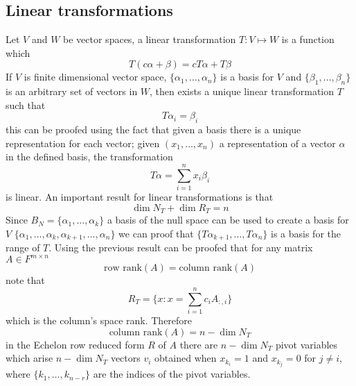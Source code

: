 \documentclass[../main.tex]{subfiles}
\begin{document}
\subsection{Linear transformations}
Let $V$ and $W$ be vector spaces, a linear transformation $T:V\mapsto W$ is a function which
\begin{equation*}
    T(c\alpha + \beta) = cT\alpha + T\beta
\end{equation*}
If $V$ is finite dimensional vector space, $\{\alpha_1,\dots,\alpha_n\}$ is a basis for $V$ and $\{\beta_1,\dots,\beta_n\}$ is an arbitrary set of vectors in $W$, then exists a unique linear transformation $T$ such that 
\begin{equation*}
    T\alpha_i = \beta_i
\end{equation*}
this can be proofed using the fact that given a basis there is a unique representation for each vector; given $(x_1,\dots,x_n)$ a representation of a vector $\alpha$ in the defined basis, the transformation
\begin{equation*}
    T\alpha = \sum_{i=1}^n x_i \beta_i
\end{equation*}
is linear.
An important result for linear transformations is that
\begin{equation*}
    \dim N_T + \dim R_T = n
\end{equation*}
Since $B_N = \{\alpha_1,\dots,\alpha_k\}$ a basis of the null space can be used to create a basis for $V$ $\{\alpha_1,\dots,\alpha_k,\alpha_{k+1},\dots,\alpha_n\}$ we can proof that $\{T\alpha_{k+1},\dots,T\alpha_n\}$ is a basis for the range of $T$.
Using the previous result can be proofed that for any matrix $A\in F^{m\times n}$
\begin{equation*}
    \text{row rank} (A) = \text{column rank} (A)
\end{equation*}
note that
\begin{equation*}
    R_T = \{x: x=\sum_{i=1}^n c_i A_{:,i}\}
\end{equation*}
which is the column's space rank. Therefore 
\begin{equation*}
    \text{column rank} (A) = n - \dim N_T
\end{equation*}
in the Echelon row reduced form $R$ of $A$ there are $n - \dim N_T$ pivot variables which arise $n - \dim N_T$ vectors $v_i$ obtained when $x_{k_i}=1$ and $x_{k_j}=0$ for $j\neq i$, where $\{k_1,\dots,k_{n-r}\}$ are the indices of the pivot variables.
\end{document}
